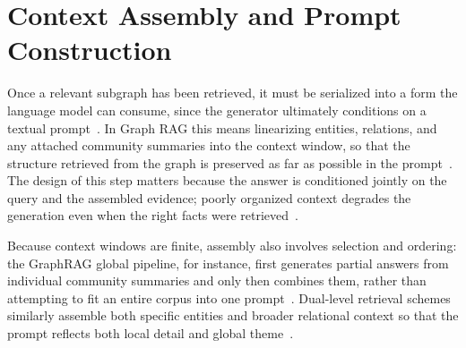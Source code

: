 \section{Context Assembly and Prompt Construction}
\label{sec:gr-context-assembly}

Once a relevant subgraph has been retrieved, it must be serialized into a form the
language model can consume, since the generator ultimately conditions on a textual
prompt~\cite{lewis2020rag}. In Graph RAG this means linearizing entities,
relations, and any attached community summaries into the context window, so that
the structure retrieved from the graph is preserved as far as possible in the
prompt~\cite{peng2024graphrag}. The design of this step matters because the answer
is conditioned jointly on the query and the assembled evidence; poorly organized
context degrades the generation even when the right facts were
retrieved~\cite{gao2023ragsurvey}.

Because context windows are finite, assembly also involves selection and ordering:
the GraphRAG global pipeline, for instance, first generates partial answers from
individual community summaries and only then combines them, rather than attempting
to fit an entire corpus into one prompt~\cite{edge2024graphrag}. Dual-level
retrieval schemes similarly assemble both specific entities and broader relational
context so that the prompt reflects both local detail and global
theme~\cite{guo2024lightrag}.

